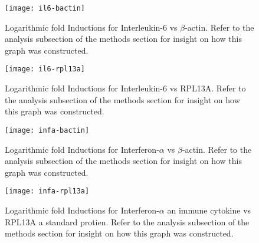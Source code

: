 \documentclass[journal, a4paper]{IEEEtran}
\begin{document}
  \begin{figure}[t]
    \centering
    \texttt{[image: il6-bactin]}
    \caption{Logarithmic fold Inductions for Interleukin-6 vs $\beta$-actin.
    Refer to the analysis subsection of the methods section for insight on how this graph was constructed.
    }
    \label{fig:mesh1}
  \end{figure}

  \begin{figure}[t]
    \centering
    \texttt{[image: il6-rpl13a]}
    \caption{Logarithmic fold Inductions for Interleukin-6 vs RPL13A.
    Refer to the analysis subsection of the methods section for insight on how this graph was constructed.
    }
    \label{fig:mesh1}
  \end{figure}

  \begin{figure}[t]
    \centering
    \texttt{[image: infa-bactin]}
    \caption{Logarithmic fold Inductions for Interferon-$\alpha$ vs $\beta$-actin.
    Refer to the analysis subsection of the methods section for insight on how this graph was constructed.
    }
    \label{fig:mesh1}
  \end{figure}

  \begin{figure}[t]
    \centering
    \texttt{[image: infa-rpl13a]}
    \caption{
    Logarithmic fold Inductions for Interferon-$\alpha$ an immune cytokine vs RPL13A a standard protien.
    Refer to the analysis subsection of the methods section for insight on how this graph was constructed.
    }
    \label{fig:mesh1}
  \end{figure}
\end{document}

